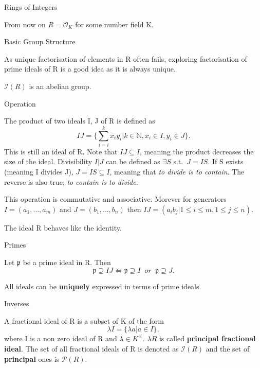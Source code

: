 \documentclass[12pt, letterpaper]{article}
\newcommand{\N}{\mathbb{N}}
\newcommand{\Ok}{\mathcal{O}}
\newcommand{\p}{\mathfrak{p}}
\begin{document}
\begin{section}{Rings of Integers}

  From now on \(R = \Ok_{K}\) for some number field K.

  \begin{subsection}{Basic Group Structure}

    As unique factorisation of elements in R often fails, exploring
    factorisation of prime ideals of R is a good idea as it is always unique.

    \(\mathcal{I}(R)\) is an abelian group.

    \begin{subsubsection}{Operation}

      The product of two ideals I, J of R is defined as
      \[IJ = \{ \sum^{k}_{i = i} x_{i}y_{i} | k \in \N, x_{i} \in I,
        y_{i} \in J \}.\] This is still an ideal of R. Note that \(IJ \subseteq
      I\), meaning the product decreases the size of the ideal. Divisibility
      \(I | J\) can be defined as \(\exists S\) s.t.\ \(J = IS\). If S
      exists (meaning I divides J), \(J = IS \subseteq I\), meaning that
      \textit{to divide is to contain}. The reverse is also true;
      \textit{to contain is to divide}.

      This operation is commutative and associative. Morever for generators
      \(I = (a_{1}, \dots , a_{m})\) and \(J = (b_{1}, \dots , b_{n})\) then
      \(IJ = (a_{i}b_{j} | 1 \leq i \leq m, 1 \leq j \leq n)\).

      The ideal R behaves like the identity.

    \end{subsubsection}

    \begin{subsubsection}{Primes}

      Let \(\p\) be a prime ideal in R. Then \[\p \supseteq IJ \iff
        \p \supseteq I \;\; or \;\; \p \supseteq J.\]

      All ideals can be \textbf{uniquely} expressed in terms of prime ideals.

    \end{subsubsection}

    \begin{subsubsection}{Inverses}

      A fractional ideal of R is a subset of K of the form \[\lambda I =
        \{ \lambda a | a \in I\},\] where I is a non zero ideal of R and
      \(\lambda \in K^{\times}\). \(\lambda R\) is called \textbf{principal
        fractional ideal}. The set of all fractional ideals of R is denoted
      as \(\mathcal{I}(R)\) and the set of \textbf{principal} ones is
      \(\mathcal{P}(R)\).


\end{subsubsection}
\end{subsection}
\end{section}
\end{document}
